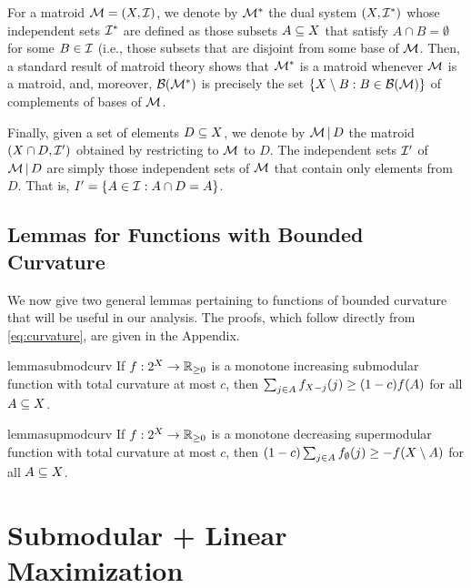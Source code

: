 \documentclass{article}
\newcommand{\reals}{\ensuremath{\mathbb{R}}}
\newcommand{\posreals}{\ensuremath{\reals_{\ge 0}}}
\DeclareMathOperator{\restrict}{\mid}
\theoremstyle{definition}
\begin{document}
For a matroid $\mathcal{M} = (X,\mathcal{I})$, we denote by $\mathcal{M}^{*}$ the dual system $(X,\mathcal{I}^{*})$ whose independent sets $\mathcal{I}^{*}$ are defined as those subsets $A \subseteq X$ that satisfy $A \cap B = \emptyset$ for some $B \in \mathcal{I}$ (i.e., those subsets that are disjoint from some base of $\mathcal{M}$.  Then, a standard result of matroid theory shows that $\mathcal{M}^{*}$ is a matroid whenever $\mathcal{M}$ is a matroid, and, moreover,  $\mathcal{B}(\mathcal{M}^{*})$ is precisely the set $\{ X \setminus B : B \in \mathcal{B}(\mathcal{M}) \}$ of complements of bases of $\mathcal{M}$.

Finally, given a set of elements $D \subseteq X$, we denote by $\M \restrict D$ the matroid $(X \cap D, \mathcal{I}')$ obtained by restricting to $\mathcal{M}$ to $D$.  The independent sets $\mathcal{I}'$ of $\M \restrict D$ are simply those independent sets of $\mathcal{M}$ that contain only elements from $D$.  That is, $I' = \{A \in \mathcal{I} :  A \cap D = A\}$.

\subsection{Lemmas for Functions with Bounded Curvature}
\label{sec:curvature}

We now give two general lemmas pertaining to functions of bounded curvature that will be useful in our analysis.  The proofs, which follow directly from \eqref{eq:curvature}, are given in the Appendix.
\begin{restatable}{lemma}{submodcurv}
\label{lem:submod-curv}
If $f : 2^{\ground} \to \posreals$ is a monotone increasing submodular function with total curvature at most $c$, then 
$\sum_{j \in A}f_{X - j}(j) \ge (1-c)f(A)$ for all $A \subseteq X$.
\end{restatable}
\begin{restatable}{lemma}{supmodcurv}
\label{lem:supmod-curv}
If $f : 2^{\ground}\to \posreals$ is a monotone decreasing supermodular function with total curvature at most $c$, then 
$(1-c)\sum_{j \in A}f_{\emptyset}(j) \ge -f(X \setminus A)$ for all $A \subseteq X$.
\end{restatable}

\section{Submodular + Linear Maximization}
\label{sec:overv-our-appr}
\end{document}

